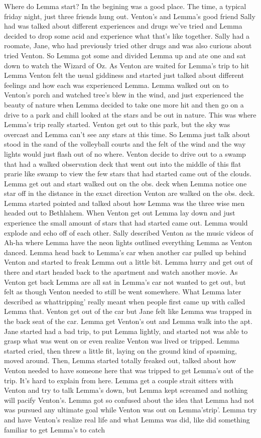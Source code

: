 \documentclass[12pt]{book}
\begin{document}
Where do Lemma start? In the begining was a good place. The time, a typical friday night, just three friends hung out. Venton's and Lemma's good friend Sally had was talked about different experiences and drugs we've tried and Lemma decided to drop some acid and experience what that's like together. Sally had a roomate, Jane, who had previously tried other drugs and was also curious about tried Venton. So Lemma got some and divided Lemma up and ate one and sat down to watch the Wizard of Oz. As Venton are waited for Lemma's trip to hit Lemma Venton felt the usual giddiness and started just talked about different feelings and how each was experienced Lemma. Lemma walked out on to Venton's porch and watched tree's blew in the wind, and just experienced the beauty of nature when Lemma decided to take one more hit and then go on a drive to a park and chill looked at the stars and be out in nature. This was where Lemma's trip really started. Venton get out to this park, but the sky was overcast and Lemma can't see any stars at this time. So Lemma just talk about stood in the sand of the volleyball courts and the felt of the wind and the way lights would just flash out of no where. Venton decide to drive out to a swamp that had a walked observation deck that went out into the middle of this flat prarie like swamp to view the few stars that had started came out of the clouds. Lemma get out and start walked out on the obs. deck when Lemma notice one star off in the distance in the exact direction Venton are walked on the obs. deck. Lemma started pointed and talked about how Lemma was the three wise men headed out to Bethlahem. When Venton get out Lemma lay down and just experience the small amount of stars that had started came out. Lemma would explode and echo off of each other. Sally described Venton as the music videos of Ah-ha where Lemma have the neon lights outlined everything Lemma as Venton danced. Lemma head back to Lemma's car when another car pulled up behind Venton and started to freak Lemma out a little bit. Lemma hurry and get out of there and start headed back to the apartment and watch another movie. As Venton get back Lemma are all sat in Lemma's car not wanted to get out, but felt as though Venton needed to still be went somewhere. What Lemma later described as whattripping' really meant when people first came up with called Lemma that. Venton get out of the car but Jane felt like Lemma was trapped in the back seat of the car. Lemma get Venton's out and Lemma walk into the apt. Jane started had a bad trip, to put Lemma lightly, and started not was able to grasp what was went on or even realize Venton was lived or tripped. Lemma started cried, then threw a little fit, laying on the ground kind of spasming, moved around. Then, Lemma started totally freaked out, talked about how Venton needed to have someone here that was tripped to get Lemma's out of the trip. It's hard to explain from here. Lemma get a couple strait sitters with Venton and try to talk Lemma's down, but Lemma kept screamed and nothing will pacify Venton's. Lemma got so confused about the idea that Lemma had not was pursued any ultimate goal while Venton was out on Lemma'strip'. Lemma try and have Venton's realize real life and what Lemma was did, like did something familiar to get Lemma's to catch 
\end{document}
